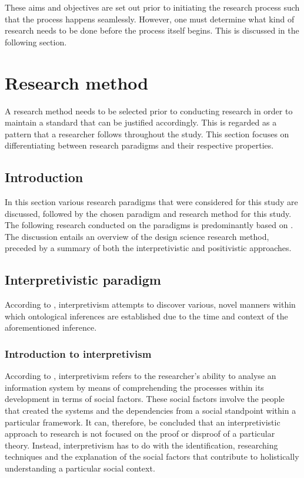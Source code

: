 These aims and objectives are set out prior to initiating the research process such that the process happens seamlessly. However, one must determine what kind of research needs to be done before the process itself begins. This is discussed in the following section.

\section{Research method}  %
A research method needs to be selected prior to conducting research in order to maintain a standard that can be justified accordingly. This is regarded as a pattern that a researcher follows throughout the study. This section focuses on differentiating between research paradigms and their respective properties.

\subsection{Introduction}
In this section various research paradigms that were considered for this study are discussed, followed by the chosen paradigm and research method for this study. The following research conducted on the paradigms is predominantly based on \cite{OatesJ2006}. The discussion entails an overview of the design science research method, preceded by a summary of both the interpretivistic and positivistic approaches.

\subsection{Interpretivistic paradigm}
According to \cite{DeVilliers2005}, interpretivism attempts to discover various, novel manners within which ontological inferences are established due to the time and context of the aforementioned inference.

\subsubsection{Introduction to interpretivism}
According to \cite{OatesJ2006}, interpretivism refers to the researcher’s ability to analyse an information system by means of comprehending the processes within its development in terms of social factors. These social factors involve the people that created the systems and the dependencies from a social standpoint within a particular framework.
It can, therefore, be concluded that an interpretivistic approach to research is not focused on the proof or disproof of a particular theory. Instead, interpretivism has to do with the identification, researching techniques and the explanation of the social factors that contribute to holistically understanding a particular social context.
